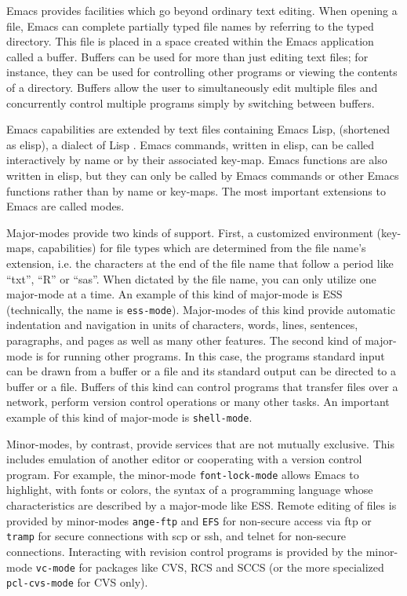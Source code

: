 \documentclass{article}
\newcommand{\stexttt}[1]{{\small\texttt{#1}}}
\begin{document}
Emacs provides facilities which go beyond ordinary text editing.
When opening a file, Emacs can complete partially typed
file names by referring to the typed directory.  This file is placed
in a space created within the Emacs application called a buffer.
Buffers can be used for more than just editing text files; for instance,
they can be used for controlling other programs or viewing the contents of
a directory.  Buffers allow the user to simultaneously edit multiple files
and concurrently control multiple programs simply by switching between buffers.

Emacs capabilities are extended by text files containing Emacs Lisp,
(shortened as elisp), a dialect of Lisp
\citep{RChassell1999,PGraham:1996}.  Emacs commands, written in elisp,
can be called interactively by name or by their associated key-map.
Emacs functions are also written in elisp, but they can only be called
by Emacs commands or other Emacs functions rather than by
name or key-maps.  The most important extensions to Emacs are called
modes.

Major-modes provide two kinds of support.
First, a customized environment (key-maps, capabilities) for file
types which are determined from the file name's extension, i.e. the characters
at the end of the file name that follow a period like ``txt'', ``R''
or ``sas''.  When dictated by the file name, you can only utilize one
major-mode at a time.  An example of this kind of major-mode is ESS
(technically, the name is \stexttt{ess-mode}).  Major-modes of this
kind provide automatic indentation and navigation in units of characters,
words, lines, sentences, paragraphs, and pages as well as many other
features.  The second kind of major-mode is for running other programs.
In this case, the programs standard input can be drawn from a buffer
or a file and its standard output can be directed to a buffer or a file.
Buffers of this kind can control programs that transfer files over a network,
perform version control operations or many other tasks.
An important example of this kind of major-mode is \stexttt{shell-mode}.

Minor-modes, by contrast, provide services that are not mutually
exclusive.  This includes emulation of another editor or cooperating
with a version control program.  For example, the minor-mode
\stexttt{font-lock-mode} allows Emacs to highlight, with fonts or
colors, the syntax of a programming language whose characteristics are
described by a major-mode like ESS.  Remote editing of files is
provided by minor-modes \stexttt{ange-ftp} and \stexttt{EFS} for
non-secure access via ftp or \stexttt{tramp} for secure connections
with scp or ssh, and telnet for non-secure connections.
Interacting with revision control
programs is provided by the minor-mode \stexttt{vc-mode} for packages
like CVS, RCS and SCCS (or the more
specialized \stexttt{pcl-cvs-mode} for CVS only).
\end{document}
